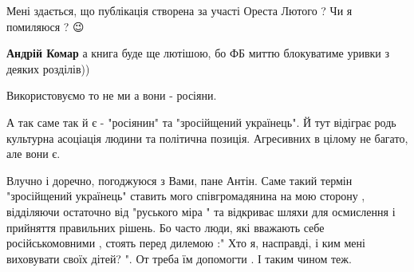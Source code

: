 \begin{itemize}
 
Мені здається, що публікація створена за участі Ореста Лютого ? Чи я помиляюся
? 😉

\begin{itemize}
 
\textbf{Андрій Комар} а книга буде ще лютішою, бо ФБ миттю блокуватиме уривки з деяких розділів))
\end{itemize}

 

Використовуємо то не ми а вони - росіяни.

А так саме так й є - "росіянин" та "зросійщений українець". Й тут відіграє родь
культурна асоціація людини та політична позиція. Агресивних в цілому не багато,
але вони є.


 

Влучно і доречно, погоджуюся з Вами, пане Антін. Саме такий термін "зросійщений
українець" ставить мого співгромадянина на мою сторону , відділяючи остаточно
від "руського міра " та відкриває шляхи для осмислення і прийняття правильних
рішень. Бо часто люди, які вважають себе російськомовними , стоять перед дилемою
:" Хто я, насправді, і ким мені виховувати своїх дітей? ". От треба їм допомогти
. І таким чином теж.

\begin{itemize}
 

\end{itemize}
\end{itemize}
